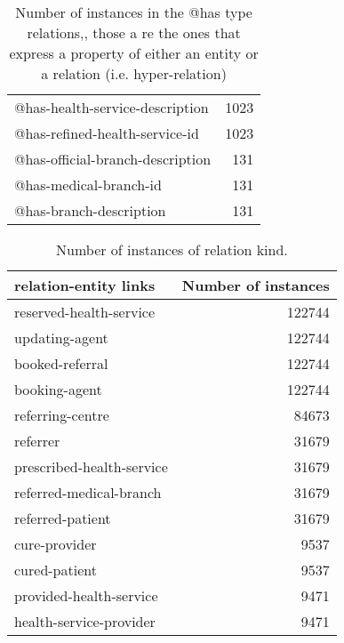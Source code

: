 \documentclass{article}
\begin{document}
\begin{table}[]
\begin{tabular}{lr}
  @has-health-service-description &               1023 \\
   @has-refined-health-service-id &               1023 \\
 @has-official-branch-description &                131 \\
           @has-medical-branch-id &                131 \\
          @has-branch-description &                131 \\
\bottomrule
\end{tabular}
\caption{Number of instances in the @has type relations,, those a re the ones that express a property of either an entity or a relation (i.e. hyper-relation)}
\label{table:hasRel}
\end{table}
\noindent
\begin{table}[]
\centering
\begin{tabular}{lr}
\toprule
       relation-entity links &  Number of instances \\
\midrule
   reserved-health-service &             122744 \\
            updating-agent &             122744 \\
           booked-referral &             122744 \\
             booking-agent &             122744 \\
          referring-centre &              84673 \\
                  referrer &              31679 \\
 prescribed-health-service &              31679 \\
   referred-medical-branch &              31679 \\
          referred-patient &              31679 \\
             cure-provider &               9537 \\
             cured-patient &               9537 \\
   provided-health-service &               9471 \\
   health-service-provider &               9471 \\
\bottomrule
\end{tabular}
\caption{Number of instances of relation kind.}
\label{table:rel}
\end{table}
\noindent
\end{document}
